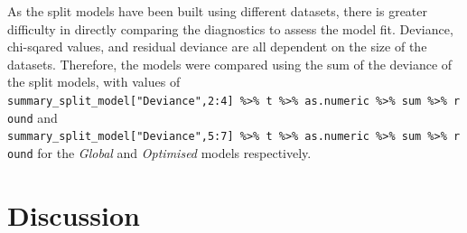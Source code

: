 \documentclass[a4paper,]{article}
\theoremstyle{definition}
\theoremstyle{definition}
\theoremstyle{definition}
\theoremstyle{remark}
\begin{document}
As the split models have been built using different datasets, there is
greater difficulty in directly comparing the diagnostics to assess the
model fit. Deviance, chi-sqared values, and residual deviance are all
dependent on the size of the datasets. Therefore, the models were
compared using the sum of the deviance of the split models, with values
of
\texttt{summary\_split\_model{[}"Deviance",2:4{]}\ \%\textgreater{}\%\ t\ \%\textgreater{}\%\ as.numeric\ \%\textgreater{}\%\ sum\ \%\textgreater{}\%\ round}
and
\texttt{summary\_split\_model{[}"Deviance",5:7{]}\ \%\textgreater{}\%\ t\ \%\textgreater{}\%\ as.numeric\ \%\textgreater{}\%\ sum\ \%\textgreater{}\%\ round}
for the \emph{Global} and \emph{Optimised} models respectively.

\begin{table}[!h]

\caption{\label{tab:kableNestedModelResults}Comparison of subset Logistic Regression Models based on the global parameters list}
\centering
{}
\end{table}

\section{Discussion}\label{discussion}
\end{document}
